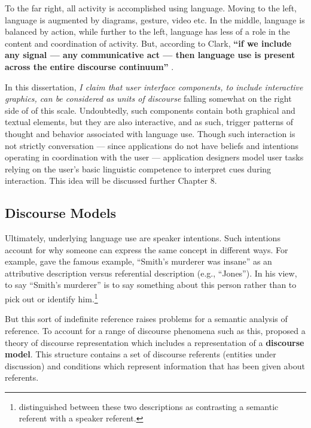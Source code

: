 To the far right, all activity is accomplished using language. Moving to the left, language is augmented by diagrams, gesture, video etc. In the middle, language is balanced by action, while further to the left, language has less of a role in the content and coordination of activity. But, according to Clark, \textbf{``if we include any signal --- any communicative act --- then language use is present across the entire discourse continuum''}   \citep[p. 51]{Clark:1996tm}.  

In this dissertation, \emph{I claim that user interface components, to include interactive graphics, can be considered as units of discourse} falling somewhat on the right side of of this scale. Undoubtedly, such components contain both graphical and textual elements, but they are also interactive, and as such, trigger patterns of thought and behavior associated with language use. Though such interaction is not strictly conversation --- since applications do not have beliefs and intentions operating in coordination with the user --- application designers model user tasks relying on the user's basic linguistic competence to interpret cues during interaction. This idea will be discussed further Chapter 8.

\subsection{Discourse Models}
\label{discoursemodels}

Ultimately, underlying language use are speaker intentions. Such intentions account for why someone can express the same concept in different ways. For example,  \cite{Donnellan:1966uv}  gave the famous example, ``Smith's murderer was insane'' as an attributive description versus referential description (e.g., ``Jones''). In his view, to say ``Smith's murderer'' is to say something about this person rather than to pick out or identify  him.\footnote{\cite{Kripke:1979ti} distinguished between these two descriptions as contrasting a semantic referent with a speaker referent.} 

But this sort of indefinite reference raises problems for a semantic analysis of reference. To account for a range of discourse phenomena such as this,  \cite{Kamp:1993wm}  proposed a theory of discourse representation which includes a representation of a \textbf{discourse model}. This structure contains a set of discourse referents (entities under discussion) and conditions which represent information that has been given about referents.

